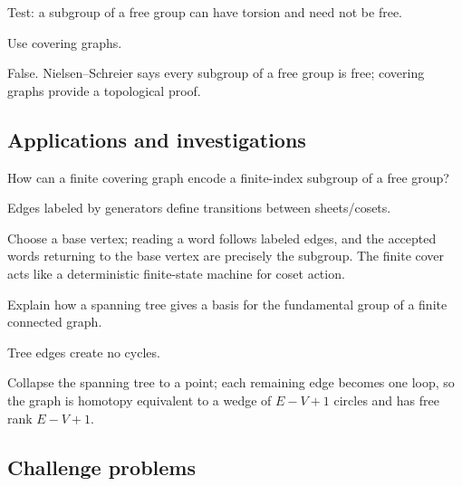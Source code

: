 \begin{exercise}\label{exr:viii14-ped-12}
Test: a subgroup of a free group can have torsion and need not be free.
\end{exercise}
\begin{hint}
Use covering graphs.
\end{hint}
\begin{solution}
False. Nielsen--Schreier says every subgroup of a free group is free; covering graphs provide a topological proof.
\end{solution}

\subsection*{Applications and investigations}

\begin{exercise}\label{exr:viii14-ped-13}
How can a finite covering graph encode a finite-index subgroup of a free group?
\end{exercise}
\begin{hint}
Edges labeled by generators define transitions between sheets/cosets.
\end{hint}
\begin{solution}
Choose a base vertex; reading a word follows labeled edges, and the accepted words returning to the base vertex are precisely the subgroup.  The finite cover acts like a deterministic finite-state machine for coset action.
\end{solution}

\begin{exercise}\label{exr:viii14-ped-14}
Explain how a spanning tree gives a basis for the fundamental group of a finite connected graph.
\end{exercise}
\begin{hint}
Tree edges create no cycles.
\end{hint}
\begin{solution}
Collapse the spanning tree to a point; each remaining edge becomes one loop, so the graph is homotopy equivalent to a wedge of $E-V+1$ circles and has free rank $E-V+1$.
\end{solution}

\subsection*{Challenge problems}

